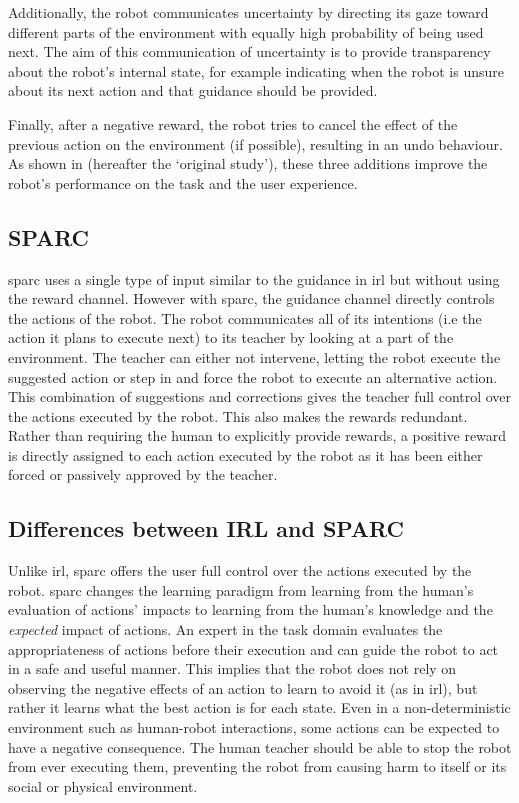 Additionally, the robot communicates uncertainty by directing its gaze toward different parts of the environment with equally high probability of being used next. The aim of this communication of uncertainty is to provide transparency about the robot's internal state, for example indicating when the robot is unsure about its next action and that guidance should be provided. 

Finally, after a negative reward, the robot tries to cancel the effect of the previous action on the environment (if possible), resulting in an undo behaviour. As shown in \cite{thomaz2008teachable} (hereafter the `original study'), these three additions improve the robot's performance on the task and the user experience.

\subsection{SPARC}

\gls{sparc} uses a single type of input similar to the guidance in \gls{irl} but without using the reward channel. However with \gls{sparc}, the guidance channel directly controls the actions of the robot. The robot communicates all of its intentions (i.e the action it plans to execute next) to its teacher by looking at a part of the environment. The teacher can either not intervene, letting the robot execute the suggested action or step in and force the robot to execute an alternative action. This combination of suggestions and corrections gives the teacher full control over the actions executed by the robot. This also makes the rewards redundant. Rather than requiring the human to explicitly provide rewards, a positive reward is directly assigned to each action executed by the robot as it has been either forced or passively approved by the teacher.

\subsection{Differences between IRL and SPARC}

Unlike \gls{irl}, \gls{sparc} offers the user full control over the actions executed by the robot. \gls{sparc} changes the learning paradigm from learning from the human's evaluation of actions' impacts to learning from the human's knowledge and the \emph{expected} impact of actions. An expert in the task domain evaluates the appropriateness of actions before their execution and can guide the robot to act in a safe and useful manner. This implies that the robot does not rely on observing the negative effects of an action to learn to avoid it (as in \gls{irl}), but rather it learns what the best action is for each state. Even in a non-deterministic environment such as human-robot interactions, some actions can be expected to have a negative consequence. The human teacher should be able to stop the robot from ever executing them, preventing the robot from causing harm to itself or its social or physical environment. 

